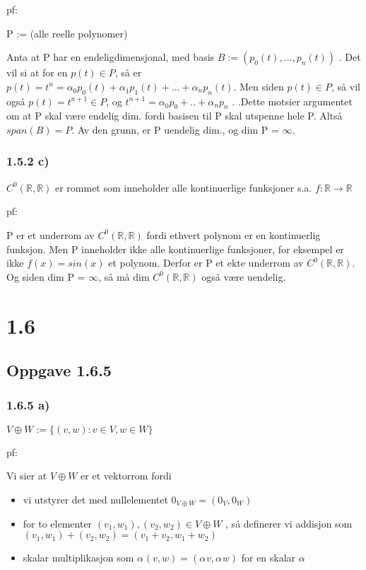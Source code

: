 \documentclass[11pt]{article}
\begin{document}
pf:

P := (alle reelle polynomer)

Anta at P har en endeligdimensjonal, med basis $ B := (p_0(t), ..., p_n(t)) $ . Det vil si at for en $ p(t) \in P $, så er $ p(t) = t^n = \alpha_{0}^{} p_0(t) + \alpha_{1}^{} p_1(t) + ... + \alpha_{n}^{} p_n(t)$. Men siden $ p(t) \in P $, så vil også $ p(t) = t^{n+1} \in P $, og $ t^{n+1} = \alpha_{0}^{} p_0 + .. + \alpha_{n}^{} p_n $ .  .Dette motsier argumentet om at P skal være endelig dim. fordi basisen til P skal utspenne hele P. Altså $ span(B) = P $. Av den grunn, er P uendelig dim., og dim P = $ \infty $.


\subsubsection{1.5.2 c)}

$ C^0 (\mathbb{R}, \mathbb{R})$ er rommet som inneholder alle kontinuerlige funksjoner s.a. $ f: \mathbb{R} \rightarrow \mathbb{R} $  

pf:

P er et underrom av $ C^0 (\mathbb{R}, \mathbb{R})$ fordi ethvert polynom er en kontinuerlig funksjon. Men P inneholder ikke alle kontinuerlige funksjoner, for eksempel er ikke $ f(x) = sin(x) $ et polynom. Derfor er P et ekte underrom av $ C^0 (\mathbb{R}, \mathbb{R})$. Og siden dim P = $ \infty $, så må dim $ C^0 (\mathbb{R}, \mathbb{R})$ også være uendelig.



\section{1.6}

\subsection{Oppgave 1.6.5}

\subsubsection{1.6.5 a)}

$ V \oplus W := \{ (v,w) : v \in V, w \in W \} $ 

pf:

Vi sier at $ V \oplus W $ er et vektorrom fordi 


\begin{itemize}
    \item vi utstyrer det med nullelementet $ 0_{V \oplus W} = (0_V, 0_W) $
    \item for to elementer $ (v_1, w_1), (v_2, w_2) \in V \oplus W $ , så definerer vi addisjon som $ (v_1, w_1) + (v_2, w_2) = (v_1 + v_2, w_1 + w_2) $
    \item skalar multiplikasjon som $ \alpha_{}^{} (v, w) = (\alpha_{}^{}  v, \alpha_{}^{}  w) $ for en skalar $ \alpha_{}^{}  $ 
\end{itemize}
\end{document}
